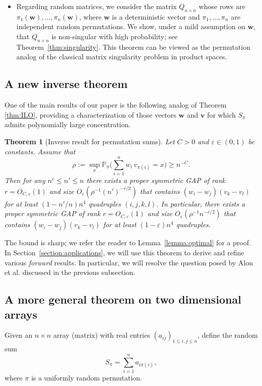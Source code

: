 \documentclass[reqno]{amsart}
\renewcommand\P{{\mathbb{P}}}
\newcommand\eps{{\varepsilon}}
\newcommand\BMv{{\bm v}}
\newcommand\BMw{{\bm w}}
\theoremstyle{plain}
\newtheorem{theorem}{Theorem}[section]
\theoremstyle{definition}
\begin{document}
\begin{itemize}
\vskip2mm 

\item Regarding random matrices, we consider the matrix $Q_{n\times n}$ whose rows are $\pi_1(\BMw),\dots,\pi_n(\BMw)$, where $\BMw$ is a deterministic vector and $\pi_1,\dots,\pi_n$ are independent random permutations. We show, under a mild assumption on $\BMw$, that $Q_{n\times n}$ is non-singular with high probability; see Theorem~\ref{thm:singularity}. This theorem can be viewed as the permutation analog of the classical matrix singularity problem in product spaces.


\end{itemize}  



\subsection{A new inverse theorem}
One of the main results of our paper is the following  analog of Theorem \ref{thm:ILO},  providing  a characterization of  those vectors $\BMw$ and $\BMv$ for which $S_{\pi}$ admits polynomially large concentration. 

\begin{theorem}[Inverse result for permutation sums]\label{thm:ILO:prod}
Let \( C>0\) and \( \eps \in (0,1) \) be constants. Assume that
\[
\rho := \sup_{x} \P_\pi\Big( \sum_{i=1}^n w_{i}\, v_{\pi(i)} = x \Big) \ge n^{-C}.
\]
Then for any $n^{\eps} \le n' \le n$ there exists a {proper symmetric} GAP of rank $r = O_{C, \eps}(1)$ and size $O_{\eps}(\rho^{-1}(n')^{-r/2})$ that contains $(w_i-w_j)(v_k-v_l)$  for at least $(1-n'/n)n^4$ quadruples $(i,j,k,l)$. In particular, there exists a {proper symmetric} GAP of rank $r = O_{C, \eps}(1)$ and size $O_{\eps}(\rho^{-1}n^{-r/2})$ that contains $(w_i-w_j)(v_k-v_l)$ for at least 
$(1-\eps)n^4$ quadruples.
\end{theorem}

The bound is sharp; we refer the reader to Lemma~\ref{lemma:optimal} for a proof. In Section~\ref{section:applications}, we will use this theorem to derive and
refine various \emph{forward} results. In particular, we will resolve the
question posed by Alon et al. discussed in the previous subsection.


\subsection {A more general theorem on two dimensional arrays} 
 Given an $n \times n$ array (matrix) with real entries $(a_{ij})_{1 \le i,j \le n}$, define the random sum
\[
S_\pi = \sum_{i=1}^n a_{i\pi(i)},
\]
where $\pi$ is a uniformly random permutation.
\end{document}

